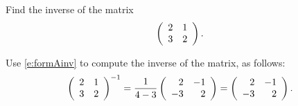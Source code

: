 \documentclass{ximera}
\begin{document}
\begin{exercise} \label{c4.9.1}
Find the inverse of the matrix
\[
\left(\begin{array}{rr} 2 & 1\\ 3 &2\end{array}\right).
\]

\begin{solution}
\soln
Use \eqref{e:formAinv} to compute the inverse of the matrix,
as follows:
\[ \left(\begin{array}{rr} 2 & 1\\ 3 &2\end{array}\right)^{-1} = \frac{1}{4-3}\left(\begin{array}{rr} 2 & -1\\ -3 &2\end{array}\right)
= \left(\begin{array}{rr} 2 & -1\\ -3 &2\end{array}\right). \]

\end{solution}
\end{exercise}
\end{document}

